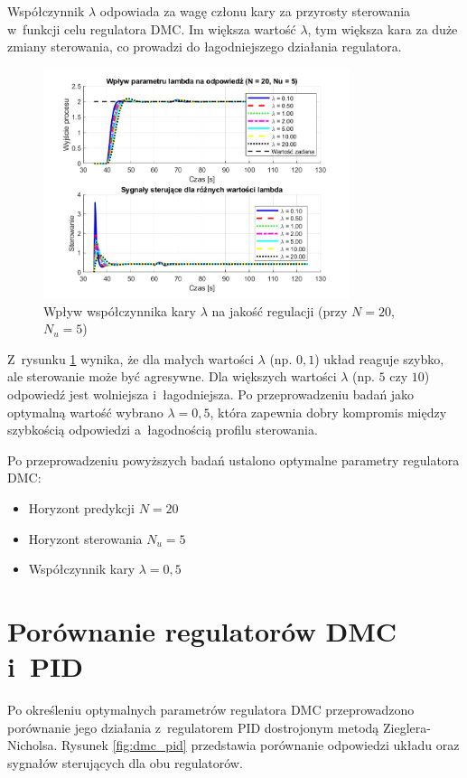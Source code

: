 \documentclass[a4paper,titlepage,11pt,floatssmall]{mwrep}
\begin{document}
Współczynnik $\lambda$ odpowiada za wagę członu kary za przyrosty sterowania w~funkcji celu regulatora DMC. Im większa wartość $\lambda$, tym większa kara za duże zmiany sterowania, co prowadzi do łagodniejszego działania regulatora.

\begin{figure}[H]
    \centering
    \includegraphics[width=0.8\textwidth]{kod/wykresy/lambda_porownanie.jpg}
    \caption{Wpływ współczynnika kary $\lambda$ na jakość regulacji (przy $N = 20$, $N_u = 5$)}
    \label{fig:lambda_comparison}
\end{figure}

Z~rysunku \ref{fig:lambda_comparison} wynika, że dla małych wartości $\lambda$ (np. $0,1$) układ reaguje szybko, ale sterowanie może być agresywne. Dla większych wartości $\lambda$ (np. $5$ czy $10$) odpowiedź jest wolniejsza i~łagodniejsza. Po przeprowadzeniu badań jako optymalną wartość wybrano $\lambda = 0,5$, która zapewnia dobry kompromis między szybkością odpowiedzi a~łagodnością profilu sterowania.

Po przeprowadzeniu powyższych badań ustalono optymalne parametry regulatora DMC:
\begin{itemize}
    \item Horyzont predykcji $N = 20$
    \item Horyzont sterowania $N_u = 5$
    \item Współczynnik kary $\lambda = 0,5$
\end{itemize}

\section{Porównanie regulatorów DMC i~PID}

Po określeniu optymalnych parametrów regulatora DMC przeprowadzono porównanie jego działania z~regulatorem PID dostrojonym metodą Zieglera-Nicholsa. Rysunek \ref{fig:dmc_pid} przedstawia porównanie odpowiedzi układu oraz sygnałów sterujących dla obu regulatorów.
\end{document}
